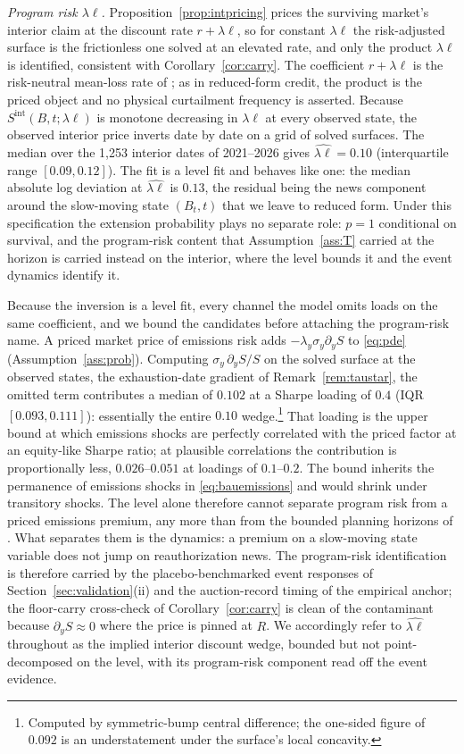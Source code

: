 \documentclass[11pt,letterpaper]{article}
\theoremstyle{plain}
\theoremstyle{definition}
\numberwithin{equation}{section}
\begin{document}
\emph{Program risk $\lambda\ell$.} Proposition~\ref{prop:intpricing} prices the surviving market's interior claim at the discount rate $r+\lambda\ell$, so for constant $\lambda\ell$ the risk-adjusted surface is the frictionless one solved at an elevated rate, and only the product $\lambda\ell$ is identified, consistent with Corollary~\ref{cor:carry}. The coefficient $r+\lambda\ell$ is the risk-neutral mean-loss rate of \citet{duffie1999}; as in reduced-form credit, the product is the priced object and no physical curtailment frequency is asserted. Because $S^{\mathrm{int}}(B,t;\lambda\ell)$ is monotone decreasing in $\lambda\ell$ at every observed state, the observed interior price inverts date by date on a grid of solved surfaces. The median over the 1{,}253 interior dates of 2021--2026 gives $\widehat{\lambda\ell}=0.10$ (interquartile range $[0.09,0.12]$). The fit is a level fit and behaves like one: the median absolute log deviation at $\widehat{\lambda\ell}$ is $0.13$, the residual being the news component around the slow-moving state $(B_t,t)$ that we leave to reduced form. Under this specification the extension probability plays no separate role: $p=1$ conditional on survival, and the program-risk content that Assumption~\ref{ass:T} carried at the horizon is carried instead on the interior, where the level bounds it and the event dynamics identify it.

Because the inversion is a level fit, every channel the model omits loads on the same coefficient, and we bound the candidates before attaching the program-risk name. A priced market price of emissions risk adds $-\lambda_y\sigma_y\partial_yS$ to \eqref{eq:pde} (Assumption~\ref{ass:prob}). Computing $\sigma_y\,\partial_yS/S$ on the solved surface at the observed states, the exhaustion-date gradient of Remark~\ref{rem:taustar}, the omitted term contributes a median of $0.102$ at a Sharpe loading of $0.4$ (IQR $[0.093,0.111]$): essentially the entire $0.10$ wedge.\footnote{Computed by symmetric-bump central difference; the one-sided figure of $0.092$ is an understatement under the surface's local concavity.} That loading is the upper bound at which emissions shocks are perfectly correlated with the priced factor at an equity-like Sharpe ratio; at plausible correlations the contribution is proportionally less, $0.026$--$0.051$ at loadings of $0.1$--$0.2$. The bound inherits the permanence of emissions shocks in \eqref{eq:bauemissions} and would shrink under transitory shocks. The level alone therefore cannot separate program risk from a priced emissions premium, any more than from the bounded planning horizons of \citet{quemin2021}. What separates them is the dynamics: a premium on a slow-moving state variable does not jump on reauthorization news. The program-risk identification is therefore carried by the placebo-benchmarked event responses of Section~\ref{sec:validation}(ii) and the auction-record timing of the empirical anchor; the floor-carry cross-check of Corollary~\ref{cor:carry} is clean of the contaminant because $\partial_yS\approx0$ where the price is pinned at $R$. We accordingly refer to $\widehat{\lambda\ell}$ throughout as the implied interior discount wedge, bounded but not point-decomposed on the level, with its program-risk component read off the event evidence.
\end{document}
